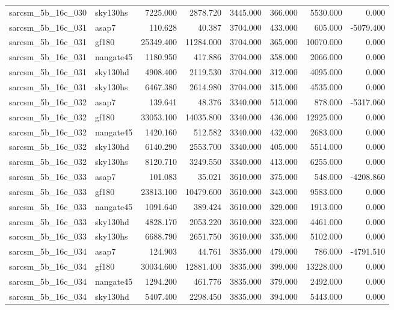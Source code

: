 \begin{tabular}{llrrrrrr}
sarcsm\_5b\_16c\_030 & sky130hs & 7225.000 & 2878.720 & 3445.000 & 366.000 & 5530.000 & 0.000 \\
sarcsm\_5b\_16c\_031 & asap7 & 110.628 & 40.387 & 3704.000 & 433.000 & 605.000 & -5079.400 \\
sarcsm\_5b\_16c\_031 & gf180 & 25349.400 & 11284.000 & 3704.000 & 365.000 & 10070.000 & 0.000 \\
sarcsm\_5b\_16c\_031 & nangate45 & 1180.950 & 417.886 & 3704.000 & 358.000 & 2066.000 & 0.000 \\
sarcsm\_5b\_16c\_031 & sky130hd & 4908.400 & 2119.530 & 3704.000 & 312.000 & 4095.000 & 0.000 \\
sarcsm\_5b\_16c\_031 & sky130hs & 6467.380 & 2614.980 & 3704.000 & 315.000 & 4535.000 & 0.000 \\
sarcsm\_5b\_16c\_032 & asap7 & 139.641 & 48.376 & 3340.000 & 513.000 & 878.000 & -5317.060 \\
sarcsm\_5b\_16c\_032 & gf180 & 33053.100 & 14035.800 & 3340.000 & 436.000 & 12925.000 & 0.000 \\
sarcsm\_5b\_16c\_032 & nangate45 & 1420.160 & 512.582 & 3340.000 & 432.000 & 2683.000 & 0.000 \\
sarcsm\_5b\_16c\_032 & sky130hd & 6140.290 & 2553.700 & 3340.000 & 405.000 & 5514.000 & 0.000 \\
sarcsm\_5b\_16c\_032 & sky130hs & 8120.710 & 3249.550 & 3340.000 & 413.000 & 6255.000 & 0.000 \\
sarcsm\_5b\_16c\_033 & asap7 & 101.083 & 35.021 & 3610.000 & 375.000 & 548.000 & -4208.860 \\
sarcsm\_5b\_16c\_033 & gf180 & 23813.100 & 10479.600 & 3610.000 & 343.000 & 9583.000 & 0.000 \\
sarcsm\_5b\_16c\_033 & nangate45 & 1091.640 & 389.424 & 3610.000 & 329.000 & 1913.000 & 0.000 \\
sarcsm\_5b\_16c\_033 & sky130hd & 4828.170 & 2053.220 & 3610.000 & 323.000 & 4461.000 & 0.000 \\
sarcsm\_5b\_16c\_033 & sky130hs & 6688.790 & 2651.750 & 3610.000 & 335.000 & 5102.000 & 0.000 \\
sarcsm\_5b\_16c\_034 & asap7 & 124.903 & 44.761 & 3835.000 & 479.000 & 786.000 & -4791.510 \\
sarcsm\_5b\_16c\_034 & gf180 & 30034.600 & 12881.400 & 3835.000 & 399.000 & 13228.000 & 0.000 \\
sarcsm\_5b\_16c\_034 & nangate45 & 1294.200 & 461.776 & 3835.000 & 379.000 & 2492.000 & 0.000 \\
sarcsm\_5b\_16c\_034 & sky130hd & 5407.400 & 2298.450 & 3835.000 & 394.000 & 5443.000 & 0.000 \\

\end{tabular}
